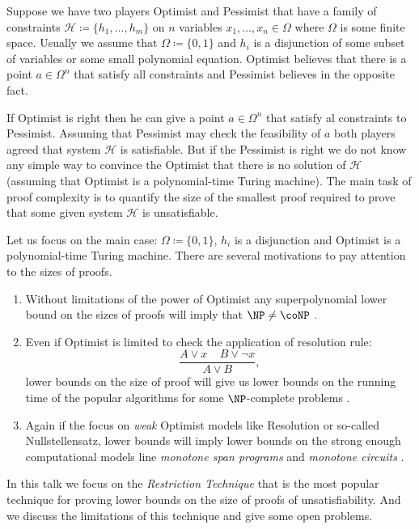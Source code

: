 Suppose we have two players Optimist and Pessimist that have a family of constraints $\mathcal{H}
\coloneqq \{h_1, \dots, h_m\}$ on $n$ variables $x_1, \dots, x_n \in \Omega$ where $\Omega$ is some
finite space. Usually we assume that $\Omega \coloneqq \{0, 1\}$ and $h_i$ is a disjunction of some subset
of variables or some small polynomial equation. Optimist believes that there is a point $a \in \Omega^n$
that satisfy all constraints and Pessimist believes in the opposite fact.

If Optimist is right then he can give a point $a \in \Omega^n$ that satisfy al constraints to
Pessimist. Assuming that Pessimist may check the feasibility of $a$ both players agreed that system
$\mathcal{H}$ is satisfiable. But if the Pessimist is right we do not know any simple way to convince the
Optimist that there is no solution of $\mathcal{H}$ (assuming that Optimist is a polynomial-time Turing
machine). The main task of proof complexity is to quantify the size of the smallest proof required to
prove that some given system $\mathcal{H}$ is unsatisfiable.

Let us focus on the main case: $\Omega \coloneqq \{0, 1\}$, $h_i$ is a disjunction and Optimist is a
polynomial-time Turing machine. There are several motivations to pay attention to the sizes of proofs.
\begin{enumerate}
    \item Without limitations of the power of Optimist any superpolynomial lower bound on the sizes of proofs
        will imply that $\NP \neq \coNP$ \cite{CookRec79}. 
    \item Even if Optimist is limited to check the application of resolution rule:
        $$
            \frac{A \lor x ~~~~~ B \lor \neg x}{A \lor B},
        $$
        lower bounds on the size of proof will give us lower bounds on the running time of the
        popular algorithms for some $\NP$-complete problems \cite{DP60, AHI05}.
    \item Again if the focus on \textit{weak} Optimist models like Resolution or so-called
        Nullstellensatz, lower bounds will imply lower bounds on the strong enough computational models
        line \textit{monotone span programs} and \textit{monotone circuits} \cite{PR18, GGKS18}.
\end{enumerate}

In this talk we focus on the \textit{Restriction Technique} that is the most popular technique for
proving lower bounds on the size of proofs of unsatisfiability. And we discuss the limitations of this
technique and give some open problems.
